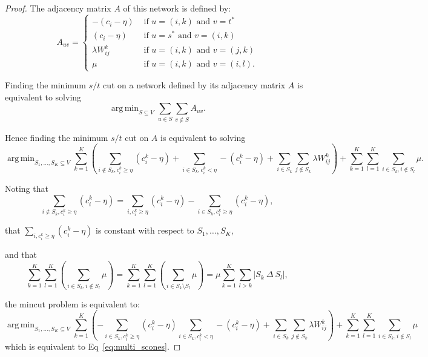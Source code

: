 \documentclass[12pt,a4paper]{article}
\newcommand{\sset}{S}
\newcommand{\vset}{V}
\DeclareMathOperator*{\argmin}{arg\,min}
\begin{document}
\begin{proof}
  The adjacency matrix $A$ of this network is defined by:
  \[
  A_{uv} =
  \begin{cases}
    - (c_i - \eta) & \mbox{ if } u = (i, k) \mbox{ and } v = t^{*} \\
    (c_i - \eta) & \mbox{ if } u = s^{*} \mbox{ and }  v = (i, k)\\
    \lambda W_{ij}^k & \mbox{ if } u = (i, k) \mbox{ and }  v = (j, k) \\
    \mu & \mbox{ if } u = (i, k) \mbox{ and } v = (i, l).
  \end{cases}
  \]

  Finding the minimum $s/t$ cut on a network defined by its adjacency matrix
  $A$ is equivalent to solving
  \[
  \argmin_{\sset \subseteq \vset} \sum_{u \in \sset} \sum_{v \notin \sset}
  A_{uv}.
  \]

  Hence finding the minimum $s/t$ cut on $A$ is equivalent to solving
  \[
  \argmin_{\sset_1, \ldots, \sset_K \subseteq \vset} \sum_{k=1}^K \left (
    \sum_{i \notin \sset_k, c_i^k \geq \eta} (c_i^k - \eta) + \sum_{i \in
      \sset_k, c_i^k < \eta} - (c_i^k - \eta) + \sum_{i \in \sset_k} \sum_{j
      \notin \sset_k} \lambda W_{ij}^k \right ) + \sum_{k=1}^K \sum_{l=1}^K
  \sum_{i \in \sset_k, i \notin \sset_l} \mu.
  \]

  Noting that
  \[ \sum_{i \notin \sset_k, c_i^k \geq \eta} (c_i^k - \eta) = \sum_{i, c_i^k
    \geq \eta} (c_i^k - \eta) - \sum_{i \in \sset_k, c_i^k \geq \eta} (c_i^k -
  \eta),\]

  that $\sum_{i, c_i^k \geq \eta} (c_i^k - \eta)$ is constant with respect to
  $\sset_1, \ldots, \sset_K$,

  and that
  \[
  \sum_{k=1}^K \sum_{l=1}^K \left( \sum_{i \in \sset_k, i \notin \sset_l} \mu
  \right) = \sum_{k=1}^K \sum_{l=1}^K \left( \sum_{i \in \sset_k \setminus
      \sset_l} \mu \right) = \mu \sum_{k=1}^K \sum_{l>k} |\sset_{k} ~\Delta~
  \sset_{l}|,
  \]


  the mincut problem is equivalent to:
  \[
  \argmin_{\sset_1, \ldots, \sset_K \subseteq \vset} \sum_{k=1}^K \left ( -
    \sum_{i \in \sset_k, c_i^k \geq \eta} (c_i^k - \eta) \sum_{i \in \sset_k,
      c_i^k < \eta} - (c_i^k - \eta) + \sum_{i \in \sset_k} \sum_{j \notin
      \sset_k} \lambda W_{ij}^k \right ) + \sum_{k=1}^K \sum_{l=1}^K \sum_{i
    \in \sset_k, i \notin \sset_l} \mu
  \]
  which is equivalent to Eq~\ref{eq:multi_scones}.
\end{proof}
\end{document}
